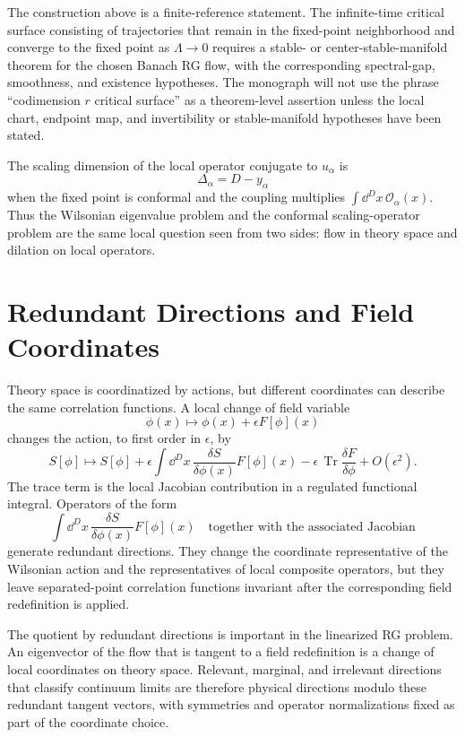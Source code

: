 The construction above is a finite-reference statement.  The infinite-time
critical surface consisting of trajectories that remain in the fixed-point
neighborhood and converge to the fixed point as \(\Lambda\to0\) requires a
stable- or center-stable-manifold theorem for the chosen Banach RG flow, with
the corresponding spectral-gap, smoothness, and existence hypotheses.  The
monograph will not use the phrase ``codimension \(r\) critical surface'' as a
theorem-level assertion unless the local chart, endpoint map, and
invertibility or stable-manifold hypotheses have been stated.

The scaling dimension of the local operator conjugate to \(u_\alpha\) is
\[
  \Delta_\alpha=D-y_\alpha
\]
when the fixed point is conformal and the coupling multiplies
\(\int\dd^Dx\,\mathcal O_\alpha(x)\).  Thus the Wilsonian eigenvalue problem
and the conformal scaling-operator problem are the same local question seen
from two sides: flow in theory space and dilation on local operators.

\section{Redundant Directions and Field Coordinates}

Theory space is coordinatized by actions, but different coordinates can
describe the same correlation functions.  A local change of field variable
\[
  \phi(x)\longmapsto \phi(x)+\epsilon F[\phi](x)
\]
changes the action, to first order in \(\epsilon\), by
\[
  S[\phi]\longmapsto
  S[\phi]
  +
  \epsilon\int\dd^Dx\,
  \frac{\delta S}{\delta\phi(x)}F[\phi](x)
  -
  \epsilon\,\operatorname{Tr}\frac{\delta F}{\delta\phi}
  +O(\epsilon^2).
\]
The trace term is the local Jacobian contribution in a regulated functional
integral.  Operators of the form
\[
  \int\dd^Dx\,
  \frac{\delta S}{\delta\phi(x)}F[\phi](x)
  \quad
  \text{together with the associated Jacobian}
\]
generate redundant directions.  They change the coordinate representative of
the Wilsonian action and the representatives of local composite operators, but
they leave separated-point correlation functions invariant after the
corresponding field redefinition is applied.

The quotient by redundant directions is important in the linearized RG
problem.  An eigenvector of the flow that is tangent to a field redefinition
is a change of local coordinates on theory space.  Relevant, marginal, and
irrelevant directions that classify continuum limits are therefore physical
directions modulo these redundant tangent vectors, with symmetries and
operator normalizations fixed as part of the coordinate choice.

